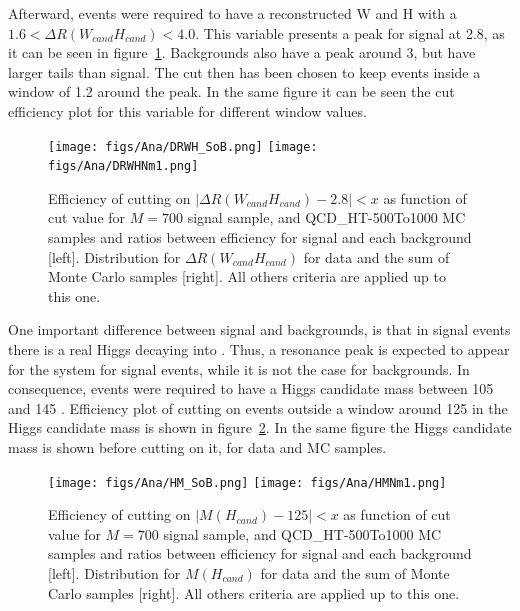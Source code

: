 Afterward, events were required to have a reconstructed W and H with a $1.6<\Delta R (W_{cand} H_{cand})<4.0$. This variable presents a peak for signal at 2.8, as it can be seen in figure~\ref{fig:DRWH}. Backgrounds also have a peak around 3, but have larger tails than signal. The cut then has been chosen to keep events inside a window of 1.2 around the peak. In the same figure it can be seen the cut efficiency plot for this variable for different window values.

\begin{figure}[!Hhtbp]
  \begin{center}
    \texttt{[image: figs/Ana/DRWH\_SoB.png]}
    \texttt{[image: figs/Ana/DRWHNm1.png]}
    \caption{Efficiency of cutting on $|\Delta R(W_{cand} H_{cand})-2.8|<x$ as function of cut value for $M=700$ \GeVcc signal sample, \ttbar and QCD\_HT-500To1000 MC samples and ratios between efficiency for signal and each background [left]. Distribution for $\Delta R (W_{cand} H_{cand})$ for data and the sum of Monte Carlo samples [right]. All others criteria are applied up to this one.}
    \label{fig:DRWH}
  \end{center}
\end{figure}

One important difference between signal and backgrounds, is that in signal events there is a real Higgs decaying into \bbbar. Thus, a resonance peak is expected to appear for the \bbbar system for signal events, while it is not the case for backgrounds. In consequence, events were required to have a Higgs candidate mass between 105 and 145 \GeVcc. Efficiency plot of cutting on events outside a window around 125 \GeVcc in the Higgs candidate mass is shown in figure~\ref{fig:HiggsMassDMC}. In the same figure the Higgs candidate mass is shown before cutting on it, for data and MC samples.

\begin{figure}[!Hhtbp]
  \begin{center}
    \texttt{[image: figs/Ana/HM\_SoB.png]}
    \texttt{[image: figs/Ana/HMNm1.png]}
    \caption{Efficiency of cutting on $|M(H_{cand})-125|<x$ as function of cut value for $M=700$ \GeVcc signal sample, \ttbar and QCD\_HT-500To1000 MC samples and ratios between efficiency for signal and each background [left]. Distribution for $M(H_{cand})$ for data and the sum of Monte Carlo samples [right]. All others criteria are applied up to this one.}
    \label{fig:HiggsMassDMC}
  \end{center}
\end{figure}


